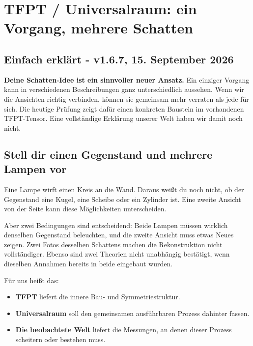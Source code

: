 \documentclass[
  ngerman,
  10pt,
  a4paper,
]{article}
\author{}
\date{}
\providecommand{\tightlist}{%
  \setlength{\itemsep}{0pt}\setlength{\parskip}{0pt}}
\begin{document}
\section{TFPT / Universalraum: ein Vorgang, mehrere
Schatten}\label{tfpt-universalraum-ein-vorgang-mehrere-schatten}

\subsection{Einfach erklärt - v1.6.7, 15. September
2026}\label{einfach-erkluxe4rt---v1.6.7-15.-september-2026}

\textbf{Deine Schatten-Idee ist ein sinnvoller neuer Ansatz.} Ein
einziger Vorgang kann in verschiedenen Beschreibungen ganz
unterschiedlich aussehen. Wenn wir die Ansichten richtig verbinden,
können sie gemeinsam mehr verraten als jede für sich. Die heutige
Prüfung zeigt dafür einen konkreten Baustein im vorhandenen TFPT-Tensor.
Eine vollständige Erklärung unserer Welt haben wir damit noch nicht.

\subsection{Stell dir einen Gegenstand und mehrere Lampen
vor}\label{stell-dir-einen-gegenstand-und-mehrere-lampen-vor}

Eine Lampe wirft einen Kreis an die Wand. Daraus weißt du noch nicht, ob
der Gegenstand eine Kugel, eine Scheibe oder ein Zylinder ist. Eine
zweite Ansicht von der Seite kann diese Möglichkeiten unterscheiden.

Aber zwei Bedingungen sind entscheidend: Beide Lampen müssen wirklich
denselben Gegenstand beleuchten, und die zweite Ansicht muss etwas Neues
zeigen. Zwei Fotos desselben Schattens machen die Rekonstruktion nicht
vollständiger. Ebenso sind zwei Theorien nicht unabhängig bestätigt,
wenn dieselben Annahmen bereits in beide eingebaut wurden.

Für uns heißt das:

\begin{itemize}
\tightlist
\item
  \textbf{TFPT} liefert die innere Bau- und Symmetriestruktur.
\item
  \textbf{Universalraum} soll den gemeinsamen ausführbaren Prozess
  dahinter fassen.
\item
  \textbf{Die beobachtete Welt} liefert die Messungen, an denen dieser
  Prozess scheitern oder bestehen muss.
\end{itemize}
\end{document}
